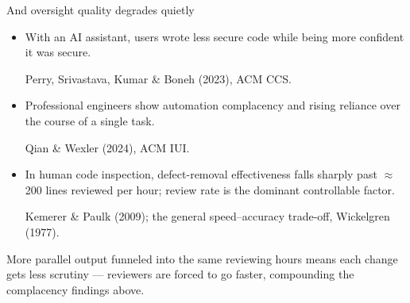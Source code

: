 \documentclass[aspectratio=169,10pt]{beamer}
\newcommand{\badc}[1]{\textcolor{Rust}{#1}}
\newcommand{\src}[1]{{\scriptsize\color{InkFaint}#1\par}}
\begin{document}
\begin{frame}{And oversight quality degrades quietly}
  \begin{itemize}
    \item With an AI assistant, users wrote \badc{less secure code} while
          being \badc{more confident} it was secure.
          \src{Perry, Srivastava, Kumar \& Boneh (2023), ACM CCS.}
    \item Professional engineers show automation complacency and rising
          reliance over the course of a single task.
          \src{Qian \& Wexler (2024), ACM IUI.}
    \item In human code inspection, defect-removal effectiveness
          \alert{falls sharply past $\approx$200 lines reviewed per hour};
          review rate is the dominant controllable factor.
          \src{Kemerer \& Paulk (2009); the general speed--accuracy trade-off, Wickelgren (1977).}
  \end{itemize}
  \vspace{1mm}
  {\small More parallel output funneled into the same reviewing hours means
   \alert{each change gets less scrutiny} --- reviewers are forced to go
   faster, compounding the complacency findings above.\par}
\end{frame}
\end{document}
